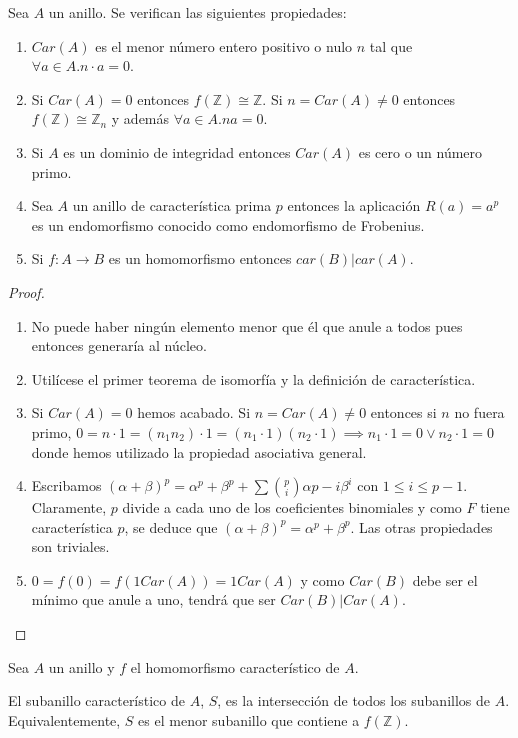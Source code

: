\begin{proposition}
Sea $A$ un anillo. Se verifican las siguientes propiedades:

\begin{enumerate}
\item $Car(A)$ es el menor número entero positivo o nulo $n$ tal que $\forall a \in A. n \cdot a = 0$. 
\item Si $Car(A) = 0$ entonces $f(\mathbb{Z}) \cong \mathbb{Z}$. Si $n = Car(A) \neq 0$ entonces $f(\mathbb{Z}) \cong \mathbb{Z}_n$ y además $\forall a \in A.na  = 0$. 
\item Si $A$ es un dominio de integridad entonces $Car(A)$ es cero o un número primo.
\item Sea $A$ un anillo de característica prima $p$ entonces la aplicación $R(a) = a^p$ es un endomorfismo conocido como endomorfismo de Frobenius.
\item Si $f: A \to B$ es un homomorfismo entonces $car(B)|car(A)$. 
\end{enumerate}
\end{proposition}
\begin{proof}
\begin{enumerate}
\item No puede haber ningún elemento menor que él que anule a todos pues entonces generaría al núcleo. 
\item Utilícese el primer teorema de isomorfía y la definición de característica.
\item Si $Car(A) = 0$ hemos acabado. Si $n = Car(A) \neq 0$ entonces si $n$ no fuera primo, $0 = n \cdot 1 = (n_1n_2) \cdot 1 = (n_1 \cdot 1)(n_2 \cdot 1) \implies n_1 \cdot 1 = 0 \lor n_2 \cdot 1 = 0$ donde hemos utilizado la propiedad asociativa general.
\item Escribamos $(\alpha+\beta)^p = \alpha^p + \beta^p + \sum \binom{p}{i} \alpha{p-i}\beta^i$ con $1 \le i \le p-1$. Claramente, $p$ divide a cada uno de los coeficientes binomiales y como $F$ tiene característica $p$, se deduce que $(\alpha+\beta)^p = \alpha^p+\beta^p$. Las otras propiedades son triviales.
\item $0 = f(0) = f(1 Car(A)) = 1 Car(A)$ y como $Car(B)$ debe ser el mínimo que anule a uno, tendrá que ser $Car(B)|Car(A)$.  
\end{enumerate}
\end{proof}

\begin{definition}
Sea $A$ un anillo y $f$ el homomorfismo característico de $A$. 

El subanillo característico de $A$, $S$, es la intersección de todos los subanillos de $A$. Equivalentemente, $S$ es el menor subanillo que contiene a $f(\mathbb{Z})$. 
\end{definition}

